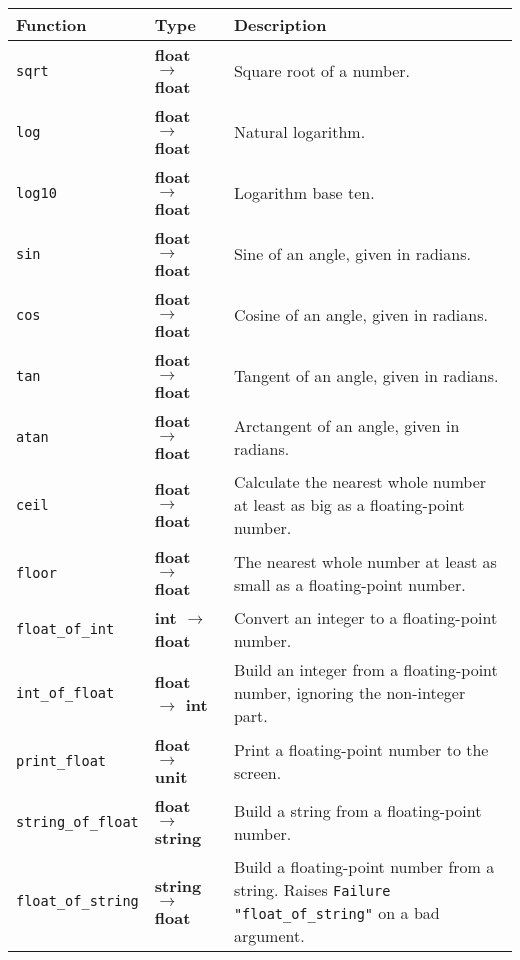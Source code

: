 \documentclass[]{book}
\renewcommand{\arraystretch}{1.2}
\newcommand{\smspace}{\vspace{4mm}}
\begin{document}
\smspace
\bgroup
\def\arraystretch{1.2}
\noindent\begin{tabular}{@{}llp{}@{}} \toprule
Function & Type & Description\\ \midrule
\index{sqrt@\texttt{sqrt}}\verb!sqrt! & \textsf{\textbf{float $\rightarrow$ float}} & Square root of a number.\\
\index{log@\texttt{log}}\verb!log! & \textsf{\textbf{float $\rightarrow$ float}} & Natural logarithm.\\
\index{log10@\texttt{log10}}\verb!log10! & \textsf{\textbf{float $\rightarrow$ float}} & Logarithm base ten.\\
\index{sin@\texttt{sin}}\verb!sin! & \textsf{\textbf{float $\rightarrow$ float}} & Sine of an angle, given in radians.\\
\index{cos@\texttt{cos}}\verb!cos! & \textsf{\textbf{float $\rightarrow$ float}} & Cosine of an angle, given in radians.\\
\index{tan@\texttt{tan}}\verb!tan! & \textsf{\textbf{float $\rightarrow$ float}} & Tangent of an angle, given in radians.\\
\index{atan@\texttt{atan}}\verb!atan! & \textsf{\textbf{float $\rightarrow$ float}} & Arctangent of an angle, given in radians.\\
\index{ceil@\texttt{ceil}}\verb!ceil! & \textsf{\textbf{float $\rightarrow$ float}} & Calculate the nearest whole number at least as big as a floating-point number.\\
\index{floor@\texttt{floor}}\verb!floor! & \textsf{\textbf{float $\rightarrow$ float}} & The nearest whole number at least as small as a floating-point number.\\
\index{float\_of\_int@\texttt{float\_of\_int}}\verb!float_of_int! & \textsf{\textbf{int $\rightarrow$ float}}& Convert an integer to a floating-point number.\\
\index{int\_of\_float@\texttt{int\_of\_float}}\verb!int_of_float!& \textsf{\textbf{float $\rightarrow$ int}}& Build an integer from a floating-point number, ignoring the non-integer part.\\
\index{print\_float@\texttt{print\_float}}\verb!print_float! & \textsf{\textbf{float $\rightarrow$ unit}} & Print a floating-point number to the screen.\\
\index{string\_of\_float@\texttt{string\_of\_float}}\verb!string_of_float! & \textsf{\textbf{float $\rightarrow$ string}} & Build a string from a floating-point number.\\
\index{float\_of\_string@\texttt{float\_of\_string}}\verb!float_of_string! & \textsf{\textbf{string $\rightarrow$ float}} & Build a floating-point number from a string. Raises \texttt{Failure\! "float\_of\_string"} on a bad argument. \\ \bottomrule
\end{tabular}
\egroup
\smspace
\end{document}
